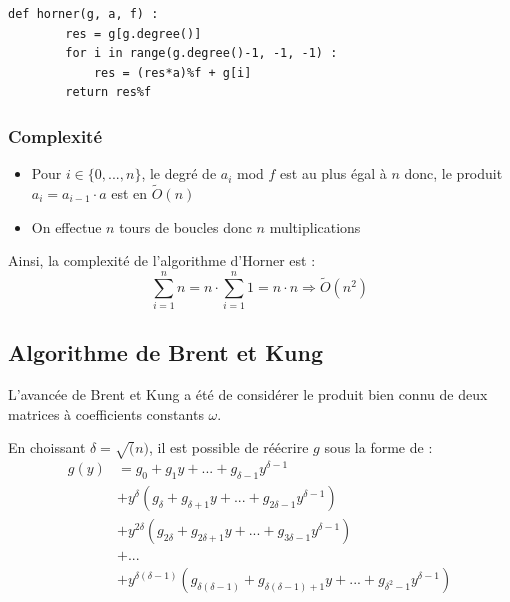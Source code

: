 \documentclass[a4paper]{article}
\begin{document}
\begin{lstlisting}[title={Horner}]
    def horner(g, a, f) :
        res = g[g.degree()]
        for i in range(g.degree()-1, -1, -1) :
            res = (res*a)%f + g[i]
        return res%f
    \end{lstlisting}

\subsubsection*{Complexité}
\begin{itemize}
    \item Pour $i \in \{0,...,n\}$, le degré de $a_i$ mod $f$ est au plus égal à $n$ donc, le produit $a_i=a_{i-1}\cdot a$ est en $\tilde{O}(n)$
    \item On effectue $n$ tours de boucles donc $n$ multiplications
\end{itemize}
Ainsi, la complexité de l'algorithme d'Horner est :
\[
\sum_{i=1}^n n=n\cdot \sum_{i=1}^n 1 = n\cdot n\Longrightarrow \tilde{O}(n^2)
\]

\subsection{Algorithme de Brent et Kung}

L'avancée de Brent et Kung a été de considérer le produit bien connu de deux matrices à coefficients constants $\omega$.


En choissant $\delta = \sqrt(n)$, il est possible de réécrire $g$ sous la forme de :
\begin{align*}
    g(y) &= g_0 + g_1y + ... + g_{\delta-1}y^{\delta-1} \\
        &+ y^\delta(g_\delta + g_{\delta+1}y + ... + g_{2\delta-1}y^{\delta-1}) \\
                                      &+ y^{2\delta}(g_{2\delta} + g_{2\delta+1}y + ... + g_{3\delta-1}y^{\delta-1}) \\
                                      &+ ... \\
                                      &+ y^{\delta(\delta-1)}(g_{\delta(\delta-1)} + g_{\delta(\delta-1)+1}y + ... + g_{\delta^2-1}y^{\delta-1}) 
\end{align*}
\end{document}
